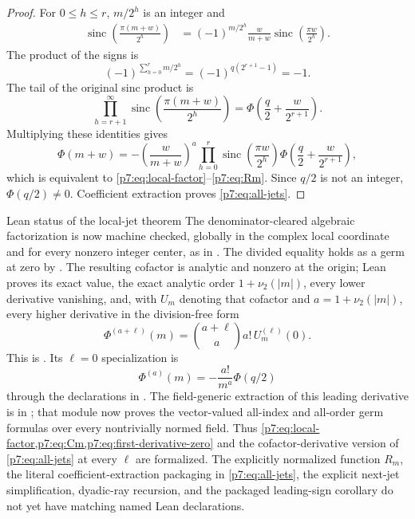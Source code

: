 \documentclass[11pt]{article}
\numberwithin{equation}{section}
\theoremstyle{definition}
\theoremstyle{remark}
\newcommand{\sinc}{\operatorname{sinc}}
\begin{document}
\begin{proof}
For $0\le h\le r$, $m/2^h$ is an integer and
\begin{align*}
 \sinc\!\left(\frac{\pi(m+w)}{2^h}\right)
 &=(-1)^{m/2^h}\frac{w}{m+w}
   \sinc\!\left(\frac{\pi w}{2^h}\right).
\end{align*}
The product of the signs is
\[
 (-1)^{\sum_{h=0}^{r}m/2^h}
 =(-1)^{q(2^{r+1}-1)}=-1.
\]
The tail of the original sinc product is
\[
 \prod_{h=r+1}^{\infty}
 \sinc\!\left(\frac{\pi(m+w)}{2^h}\right)
 =\Phi\!\left(\frac q2+\frac{w}{2^{r+1}}\right).
\]
Multiplying these identities gives
\[
 \Phi(m+w)=-\left(\frac{w}{m+w}\right)^a
 \prod_{h=0}^{r}\sinc\!\left(\frac{\pi w}{2^h}\right)
 \Phi\!\left(\frac q2+\frac{w}{2^{r+1}}\right),
\]
which is equivalent to \cref{p7:eq:local-factor}--\cref{p7:eq:Rm}.  Since $q/2$ is not an integer, $\Phi(q/2)\ne0$.  Coefficient extraction proves \cref{p7:eq:all-jets}.
\end{proof}

\begin{statusboxPartxx}{Lean status of the local-jet theorem}
The denominator-cleared algebraic factorization is now machine checked,
globally in the complex local coordinate and for every nonzero integer
center, as
 in
.  The divided equality holds as a
germ at zero by
.
The resulting cofactor is analytic and nonzero at the origin; Lean proves
its exact value, the exact analytic order \(1+\nu_2(|m|)\), every lower
derivative vanishing, and, with \(U_m\) denoting that cofactor and
\(a=1+\nu_2(|m|)\), every higher derivative in the division-free form
\[
 \Phi^{(a+\ell)}(m)=\binom{a+\ell}{a}a!\,U_m^{(\ell)}(0).
\]
This is
.  Its
\(\ell=0\) specialization is
\[
 \Phi^{(a)}(m)=-\frac{a!}{m^a}\Phi(q/2)
\]
through the declarations in .  The
field-generic extraction of this leading derivative is in
; that module now proves the vector-valued all-index and
all-order germ formulas over every nontrivially normed field.  Thus
\cref{p7:eq:local-factor,p7:eq:Cm,p7:eq:first-derivative-zero} and the
cofactor-derivative version of \cref{p7:eq:all-jets} at every \(\ell\) are
formalized.  The explicitly normalized function \(R_m\), the literal
coefficient-extraction packaging in \cref{p7:eq:all-jets}, the explicit
next-jet simplification, dyadic-ray recursion, and the packaged leading-sign
corollary do not yet have matching named Lean declarations.
\end{statusboxPartxx}
\end{document}

